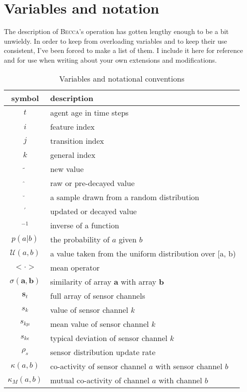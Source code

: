 \chapter{Variables and notation}
\label{notation}

The description of \textsc{Becca}'s operation has gotten lengthy enough to be a bit unwieldy. In order to keep from overloading variables and to keep their use consistent, I've been forced to make a list of them. I include it here for reference and for use when writing about your own extensions and modifications.

\begin{table}[htdp]
\caption{Variables and notational conventions}
\begin{center}
\begin{tabular}{|c|l|}
\hline
symbol & description \\
\hline
$t$ & agent age in time steps \\
$i$ & feature index \\
$j$ & transition index \\
$k$ & general index \\
$\tilde{ }$ & new value\\
$\hat{ }$ & raw or pre-decayed value\\
$\check{ }$ & a sample drawn from a random distribution \\
$ ^\prime$ & updated or decayed value \\
$^{-1}$ & inverse of a function \\ 
$p(a|b)$ & the probability of $a$ given $b$ \\
$\mathcal{U}(a,b)$ & a value taken from the uniform distribution over [a, b) \\
$ < \cdot > $ & mean operator \\
$\sigma(\mathbf{a}, \mathbf{b})$ & similarity of array $\mathbf{a}$ with  array $\mathbf{b}$ \\
$\mathbf{s}_t$ & full array of sensor channels\\ 
$s_{k}$ & value of sensor channel $k$\\
$s_{k \mu}$ & mean value of sensor channel $k$\\
$s_{k \epsilon}$ & typical deviation of sensor channel $k$\\
$\rho_s$ & sensor distribution update rate \\
$\kappa(a, b)$ & co-activity of sensor channel $a$ with sensor channel $b$\\
$\kappa_M(a,b)$ & mutual co-activity of channel $a$ with channel $b$ \\

\end{tabular}
\end{center}
\end{table}
